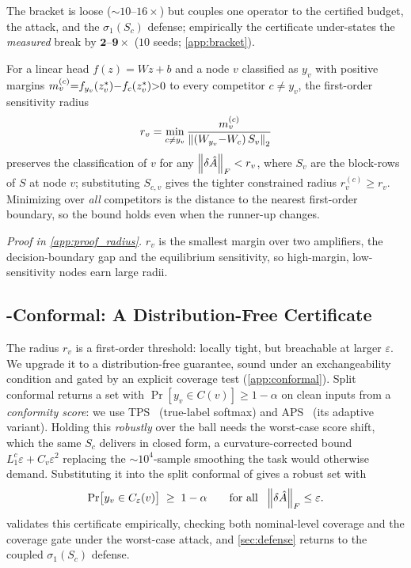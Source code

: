 The bracket is loose (${\sim}10$--$16\times$) but couples one operator to the certified budget, the attack, and the $\sigma_1(S_c)$ defense; empirically the certificate under-states the \emph{measured} break by $\mathbf{2}$--$\mathbf{9\times}$ ($10$ seeds; \cref{app:bracket}).

\begin{proposition}
\label{prop:radius}
For a linear head $f(z){=}Wz{+}b$ and a node $v$ classified as $y_v$ with positive margins $m_v^{(c)}{=}f_{y_v}(z^{*}_v){-}f_c(z^{*}_v){>}0$ to every competitor $c{\neq}y_v$, the first-order sensitivity radius
\begin{equation}
r_v = \min_{c\neq y_v} \frac{m_v^{(c)}}{\left\|(W_{y_v}{-}W_c)\,S_v\right\|_2}
\label{eq:radius}
\end{equation}
preserves the classification of $v$ for any $\left\|\delta\hat{A}\right\|_F < r_v$, where $S_v$ are the block-rows of $S$ at node $v$; substituting $S_{c,v}$ gives the tighter constrained radius $r_v^{(c)}{\geq}r_v$. Minimizing over \emph{all} competitors is the distance to the nearest first-order boundary, so the bound holds even when the runner-up changes.
\end{proposition}

\noindent\textit{Proof in \cref{app:proof_radius}.} $r_v$ is the smallest margin over two amplifiers, the decision-boundary gap and the equilibrium sensitivity, so high-margin, low-sensitivity nodes earn large radii.

\subsection{\AEGIS-Conformal: A Distribution-Free Certificate}
\label{sec:conformal}
The radius $r_v$ is a first-order threshold: locally tight, but breachable at larger $\varepsilon$. We upgrade it to a distribution-free guarantee, sound under an exchangeability condition and gated by an explicit coverage test (\cref{app:conformal}). Split conformal returns a set with $\Pr[y_v\in C(v)]\geq1{-}\alpha$ on clean inputs from a \emph{conformity score}: we use TPS~\citep{sadinle2019least} (true-label softmax) and APS~\citep{romano2020classification} (its adaptive variant). Holding this \emph{robustly} over the ball needs the worst-case score shift, which the same $S_c$ delivers in closed form, a curvature-corrected bound $L_1^{c}\varepsilon{+}C_v\varepsilon^2$ replacing the ${\sim}10^4$-sample smoothing the task would otherwise demand. Substituting it into the split conformal of \citet{zargarbashi2023conformal} gives a robust set with
\begin{equation}
\Pr\!\big[y_v\in C_\varepsilon(v)\big]\;\geq\;1-\alpha
\qquad\text{for all }\ \left\|\delta\hat{A}\right\|_F\leq\varepsilon .
\label{eq:conformal}
\end{equation}
 validates this certificate empirically, checking both nominal-level coverage and the coverage gate under the worst-case attack, and \cref{sec:defense} returns to the coupled $\sigma_1(S_c)$ defense.

